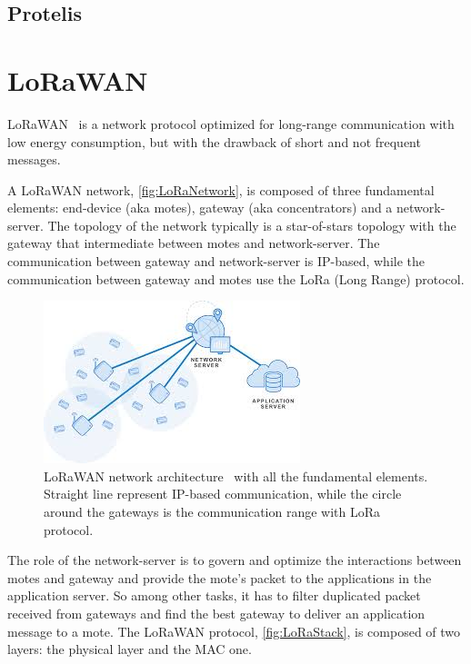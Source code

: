 \subsection{Protelis}




\section{LoRaWAN}
LoRaWAN~\cite{loraalliancetechnicalcommittee2020} is a network protocol optimized for long-range communication with low energy consumption, but with the drawback of short and not frequent messages.

A LoRaWAN network, \autoref{fig:LoRaNetwork}, is composed of three fundamental elements: end-device (aka motes), gateway (aka concentrators) and a network-server. 
% 
The topology of the network typically is a star-of-stars topology with the gateway that intermediate between motes and network-server.
% 
The communication between gateway and network-server is IP-based, while the communication between gateway and motes use the LoRa (Long Range) protocol.

\begin{figure}[h]
    \centering
    \includegraphics{figures/lora_architecture2.png}
    \caption{LoRaWAN network architecture~\cite{muntasirjoarder2020} with all the fundamental elements. Straight line represent IP-based communication, while the circle around the gateways is the communication range with LoRa protocol.}
    \label{fig:LoRaNetwork}
\end{figure}

The role of the network-server is to govern and optimize the interactions between motes and gateway and provide the mote's packet to the applications in the application server.
% 
So among other tasks, it has to filter duplicated packet received from gateways and find the best gateway to deliver an application message to a mote.
% 
The LoRaWAN protocol, \autoref{fig:LoRaStack}, is composed of two layers: the  physical layer and the MAC one.

